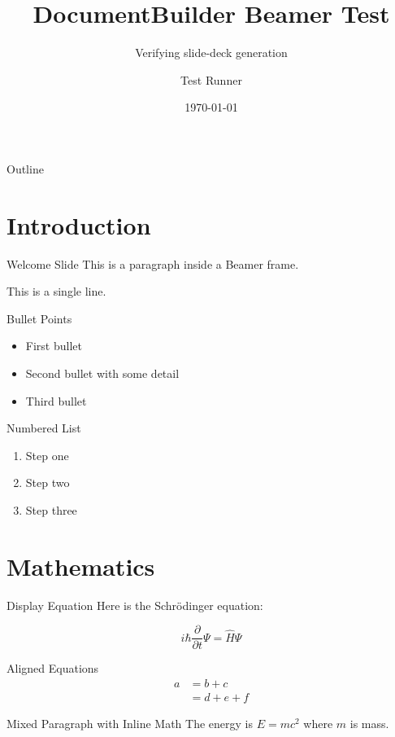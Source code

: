 \documentclass{beamer}%
\title{DocumentBuilder Beamer Test}%
\subtitle{Verifying slide{-}deck generation}%
\author{Test Runner}%
\date{\today}%
\begin{document}
%
\pagestyle{empty}%
\normalsize%
\begin{frame}%
\titlepage%
\end{frame}%
\begin{frame}{Outline}%
\tableofcontents%
\end{frame}%
\section{Introduction}%
\begin{frame}{Welcome Slide}%
This is a paragraph inside a Beamer frame.%
\par%
This is a single line.%
\\%
\end{frame}%
\begin{frame}{Bullet Points}%
\begin{itemize}%
\item%
First bullet%
\item%
Second bullet with some detail%
\item%
Third bullet%
\end{itemize}%
\end{frame}%
\begin{frame}{Numbered List}%
\begin{enumerate}%
\item%
Step one%
\item%
Step two%
\item%
Step three%
\end{enumerate}%
\end{frame}%
\section{Mathematics}%
\begin{frame}{Display Equation}%
Here is the Schrödinger equation:%
\par%
\[%
i\hbar \frac{\partial}{\partial t}\Psi = \hat{H}\Psi%
\]%
\end{frame}%
\begin{frame}{Aligned Equations}%
\begin{align*}%
a &= b + c \\%
&= d + e + f%
\end{align*}%
\end{frame}%
\begin{frame}{Mixed Paragraph with Inline Math}%
The energy is %
$E = mc^{2}$%
 where %
$m$%
 is mass.%
\par%
\end{frame}%
\end{document}

